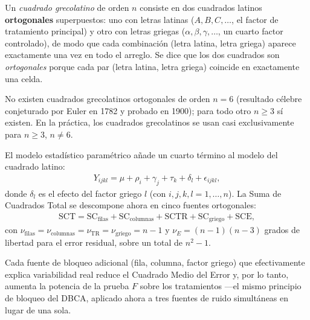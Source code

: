 \begin{definicion}
	Un \emph{cuadrado grecolatino} de orden $n$ consiste en dos cuadrados latinos \textbf{ortogonales} superpuestos: uno con letras latinas ($A, B, C, \ldots$, el factor de tratamiento principal) y otro con letras griegas ($\alpha, \beta, \gamma, \ldots$, un cuarto factor controlado), de modo que cada combinación (letra latina, letra griega) aparece exactamente una vez en todo el arreglo. Se dice que los dos cuadrados son \emph{ortogonales} porque cada par (letra latina, letra griega) coincide en exactamente una celda.
\end{definicion}

\begin{observacion}
	No existen cuadrados grecolatinos ortogonales de orden $n=6$ (resultado célebre conjeturado por Euler en 1782 y probado en 1900); para todo otro $n \geq 3$ sí existen. En la práctica, los cuadrados grecolatinos se usan casi exclusivamente para $n \geq 3$, $n \neq 6$.
\end{observacion}

El modelo estadístico paramétrico añade un cuarto término al modelo del cuadrado latino:
\begin{align}
	Y_{ijkl} = \mu + \rho_i + \gamma_j + \tau_k + \delta_l + \epsilon_{ijkl},
	\label{eq:modelo_cuadrado_grecolatino}
\end{align}
donde $\delta_l$ es el efecto del factor griego $l$ (con $i,j,k,l = 1,\ldots,n$). La Suma de Cuadrados Total se descompone ahora en cinco fuentes ortogonales:
\begin{align}
	\text{SCT} = \text{SC}_{\text{filas}} + \text{SC}_{\text{columnas}} + \text{SCTR} + \text{SC}_{\text{griego}} + \text{SCE},
\end{align}
con $\nu_{\text{filas}} = \nu_{\text{columnas}} = \nu_{\text{TR}} = \nu_{\text{griego}} = n-1$ y $\nu_E = (n-1)(n-3)$ grados de libertad para el error residual, sobre un total de $n^2 - 1$.

\begin{observacion}
	Cada fuente de bloqueo adicional (fila, columna, factor griego) que efectivamente explica variabilidad real reduce el Cuadrado Medio del Error y, por lo tanto, aumenta la potencia de la prueba $F$ sobre los tratamientos —el mismo principio de bloqueo del DBCA, aplicado ahora a tres fuentes de ruido simultáneas en lugar de una sola.
\end{observacion}
